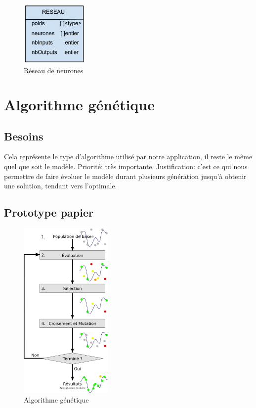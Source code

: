 \begin{figure}[H]
    \centering
    \includegraphics[width=0.3\textwidth]{./pictures/reseau.png}
    \caption{Réseau de neurones}
\end{figure}

\section{Algorithme génétique}
\subsection{Besoins}
Cela représente le type d'algorithme utilisé par notre application, il reste le même quel que soit le modèle.
Priorité: très importante.
Justification: c'est ce qui nous permettre de faire évoluer le modèle durant plusieurs génération jusqu'à obtenir une solution, tendant vers l'optimale.
\subsection{Prototype papier}

\begin{figure}[H]
    \centering
    \includegraphics[width=0.4\textwidth]{./pictures/algorithme_genetique.png}
    \caption{Algorithme génétique}
\end{figure}


